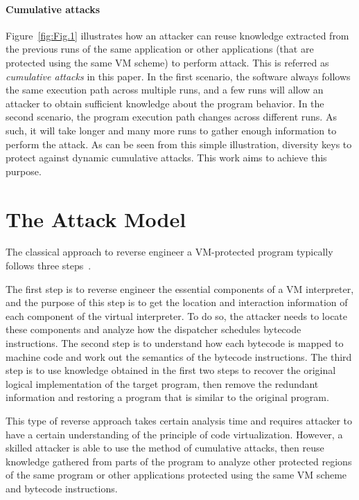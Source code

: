 \documentclass[preprint,12pt,3p]{elsarticle}
\begin{document}
\paragraph*{Cumulative attacks}
Figure~\ref{fig:Fig.1} illustrates how an attacker
can reuse knowledge extracted from the previous runs of the same application or
other applications (that are protected using the same VM scheme) to perform attack.
This is referred as \emph{cumulative attacks} in this paper.
In the first scenario, the software always follows the same execution path
across multiple runs, and a few runs will allow an attacker to
obtain sufficient knowledge about the program behavior.
In the second scenario, the program execution path changes across different runs.
As such, it will take longer and many more runs to gather enough information to perform the attack.
As can be seen from this simple illustration, diversity keys to protect against dynamic cumulative attacks.
This work aims to achieve this purpose.


\section{The Attack Model}\label{sec:attack}
The classical approach to reverse engineer a VM-protected program typically
follows three steps~\cite{10falliere2009inside,17rolles2009unpacking}. %

The first step is to reverse engineer the essential components of a VM interpreter,
and the purpose of this step is to get the location and interaction information of each
component of the virtual interpreter. To do so, the attacker needs to locate
these components and analyze how the dispatcher schedules bytecode instructions.
The second step is to understand how each bytecode is mapped to machine code
and work out the semantics of the bytecode instructions.
The third step is to use knowledge obtained in the first two steps to recover the original
logical implementation of the target program, then remove the redundant information
and restoring a program that is similar to the original program.


This type of reverse approach takes certain analysis time and requires attacker to
have a certain understanding of the principle of code virtualization.
However, a skilled attacker is able to use the method of cumulative attacks, then reuse knowledge
gathered from parts of the program to analyze other protected regions of
the same program or other applications protected using the same VM scheme and bytecode instructions.
\end{document}

